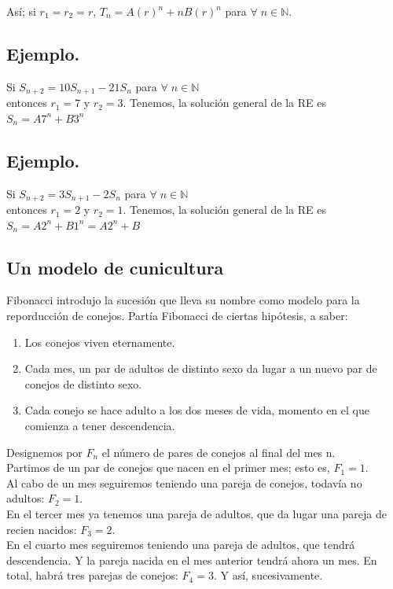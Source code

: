 \documentclass{article}
\begin{document}
Así; si $r_1 = r_2 = r$, $T_n = A(r)^n + nB(r)^n$ para $\forall \; n \in \mathbb{N}$.
 
 \subsection{Ejemplo.}
 Si $S_{n+2} = 10S_{n+1} - 21S_n$ para $\forall \; n \in \mathbb{N}$\\
 entonces $r_1 = 7$ y $r_2 = 3$. Tenemos, la solución general de la RE es $S_n= A 7^n + B 3^{n}$
 
 \subsection{Ejemplo.}
Si $S_{n+2} = 3S_{n+1} - 2S_n$ para $\forall \; n \in \mathbb{N}$\\
 entonces $r_1 =2$ y $r_2 = 1$. Tenemos, la solución general de la RE es $S_n= A 2^n + B 1^{n} = A2^n + B$\\

\newpage
\subsection{Un modelo de cunicultura}

Fibonacci introdujo la sucesión que lleva su nombre como modelo para la reporducción de conejos. Partía Fibonacci de ciertas hipótesis, a saber:
\begin{enumerate}
    \item Los conejos viven eternamente.
    \item Cada mes, un par de adultos de distinto sexo da lugar a un nuevo par de conejos de distinto sexo.
    \item Cada conejo se hace adulto a los dos meses de vida, momento en el que comienza a tener descendencia.
\end{enumerate}
Designemos por $F_n$ el número de pares de conejos al final del mes n.\\
Partimos de un par de conejos que nacen en el primer mes; esto es, $F_1=1$.\\
Al cabo de un mes seguiremos teniendo una pareja de conejos, todavía no adultos: $F_2=1$.\\
En el tercer mes ya tenemos una pareja de adultos, que da lugar una pareja de recien nacidos: $F_3=2$.\\
En el cuarto mes seguiremos teniendo una pareja de adultos, que tendrá descendencia. Y la pareja nacida en el mes anterior tendrá ahora un mes. En total, habrá tres parejas de conejos: $F_4=3$. Y así, sucesivamente.\\\\
\end{document}
